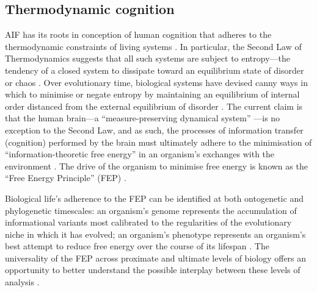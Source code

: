 \begin{CJK}{UTF8}{gbsn}
\subsection{Thermodynamic cognition\label{sect:thermoCog}}
AIF has its roots in conception of human cognition that adheres to the thermodynamic constraints of living systems \citep{Yufik2017}.  In particular, the Second Law of Thermodynamics suggests that all such systems are subject to entropy---the tendency of a closed system to dissipate toward an equilibrium state of disorder or chaos \citep{Wolfram2002}.  Over evolutionary time, biological systems have devised canny ways in which to minimise or negate entropy by maintaining an equilibrium of internal order distanced from the external equilibrium of disorder \citep{Schrodinger1944}.  The current claim is that the human brain---a ``measure-preserving dynamical system'' \citep[c.f.][]{Friston2013}---is no exception to the Second Law, and as such, the processes of information transfer (cognition) performed by the brain must ultimately adhere to the minimisation of ``information-theoretic free energy'' in an organism's exchanges with the environment \citep[entropy can be understood as the average quantity of free energy to which an organism is subject][]{Yufik2002,Yufik2013,Friston2010,Sengupta2013,Sengupta2016,Sengupta2017}. The drive of the organism to minimise free energy is known as the ``Free Energy Principle'' (FEP) \citep[see][]{Friston2010}.

Biological life's adherence to the FEP can be identified at both ontogenetic and phylogenetic timescales: an organism's genome represents the accumulation of informational variants most calibrated to the regularities of the evolutionary niche in which it has evolved; an organism's phenotype represents an organism's best attempt to reduce free energy over the course of its lifespan \citep{Ramstead2017}.  The universality of the FEP across proximate and ultimate levels of biology offers an opportunity to better understand the possible interplay between these levels of analysis \citep{Laland2015,Ramstead2017}.


\end{CJK}
